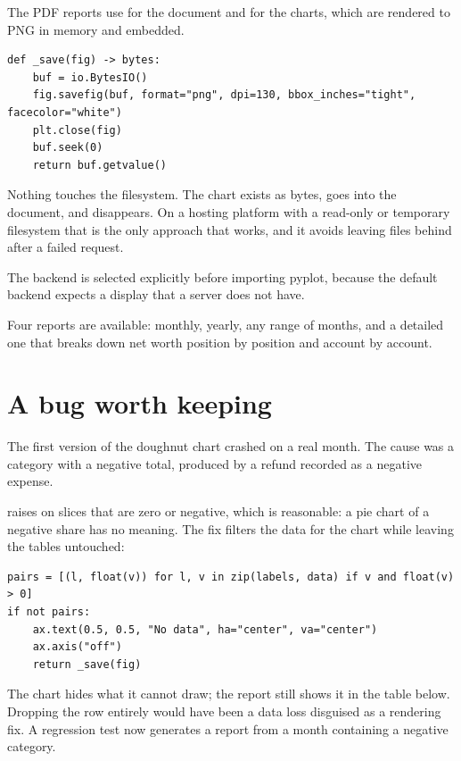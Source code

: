 The PDF reports use  for the document and  for
the charts, which are rendered to PNG in memory and embedded.

\begin{lstlisting}[style=py]
def _save(fig) -> bytes:
    buf = io.BytesIO()
    fig.savefig(buf, format="png", dpi=130, bbox_inches="tight", facecolor="white")
    plt.close(fig)
    buf.seek(0)
    return buf.getvalue()
\end{lstlisting}

Nothing touches the filesystem. The chart exists as bytes, goes into the
document, and disappears. On a hosting platform with a read-only or temporary
filesystem that is the only approach that works, and it avoids leaving files
behind after a failed request.

The  backend is selected explicitly before importing pyplot, because
the default backend expects a display that a server does not have.

Four reports are available: monthly, yearly, any range of months, and a detailed
one that breaks down net worth position by position and account by account.

\section{A bug worth keeping}

The first version of the doughnut chart crashed on a real month. The cause was a
category with a negative total, produced by a refund recorded as a negative
expense.

 raises on slices that are zero or negative, which is
reasonable: a pie chart of a negative share has no meaning. The fix filters the
data for the chart while leaving the tables untouched:

\begin{lstlisting}[style=py]
pairs = [(l, float(v)) for l, v in zip(labels, data) if v and float(v) > 0]
if not pairs:
    ax.text(0.5, 0.5, "No data", ha="center", va="center")
    ax.axis("off")
    return _save(fig)
\end{lstlisting}

\begin{keypoint}
The chart hides what it cannot draw; the report still shows it in the table
below. Dropping the row entirely would have been a data loss disguised as a
rendering fix. A regression test now generates a report from a month containing a
negative category.
\end{keypoint}

